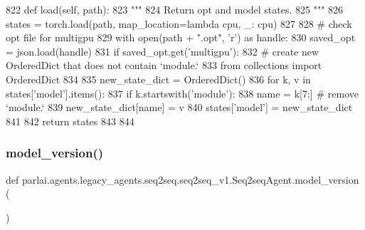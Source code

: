 \begin{DoxyCode}
822     \textcolor{keyword}{def }load(self, path):
823         \textcolor{stringliteral}{"""}
824 \textcolor{stringliteral}{        Return opt and model states.}
825 \textcolor{stringliteral}{        """}
826         states = torch.load(path, map\_location=\textcolor{keyword}{lambda} cpu, \_: cpu)
827 
828         \textcolor{comment}{# check opt file for multigpu}
829         with open(path + \textcolor{stringliteral}{".opt"}, \textcolor{stringliteral}{'r') as handle:}
830 \textcolor{stringliteral}{            saved\_opt = json.load(handle)}
831 \textcolor{stringliteral}{        }\textcolor{keywordflow}{if} saved\_opt.get(\textcolor{stringliteral}{'multigpu'}):
832             \textcolor{comment}{# create new OrderedDict that does not contain `module.`}
833             \textcolor{keyword}{from} collections \textcolor{keyword}{import} OrderedDict
834 
835             new\_state\_dict = OrderedDict()
836             \textcolor{keywordflow}{for} k, v \textcolor{keywordflow}{in} states[\textcolor{stringliteral}{'model'}].items():
837                 \textcolor{keywordflow}{if} k.startswith(\textcolor{stringliteral}{'module'}):
838                     name = k[7:]  \textcolor{comment}{# remove `module.`}
839                     new\_state\_dict[name] = v
840             states[\textcolor{stringliteral}{'model'}] = new\_state\_dict
841 
842         \textcolor{keywordflow}{return} states
843 
844 
\end{DoxyCode}
\mbox{\label{classparlai_1_1agents_1_1legacy__agents_1_1seq2seq_1_1seq2seq__v1_1_1Seq2seqAgent_a3838eb2d88b4e9f80c9c234e6742fa30}} 
\subsubsection{\texorpdfstring{model\+\_\+version()}{model\_version()}}
{\footnotesize\ttfamily def parlai.\+agents.\+legacy\+\_\+agents.\+seq2seq.\+seq2seq\+\_\+v1.\+Seq2seq\+Agent.\+model\+\_\+version (\begin{DoxyParamCaption}{ }\end{DoxyParamCaption})\hspace{0.3cm}{\ttfamily [static]}}

